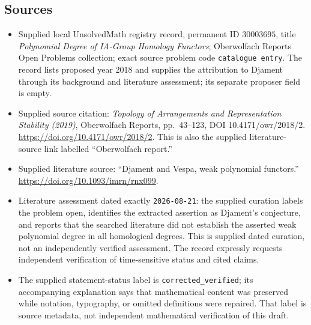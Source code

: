 \documentclass[11pt]{article}
\begin{document}
\subsection{Sources}
\begin{itemize}
\item Supplied local UnsolvedMath registry record, permanent ID \(30003695\), title \emph{Polynomial Degree of IA-Group Homology Functors}; Oberwolfach Reports Open Problems collection; exact source problem code \texttt{catalogue entry}. The record lists proposed year 2018 and supplies the attribution to Djament through its background and literature assessment; its separate proposer field is empty.
\item Supplied source citation: \emph{Topology of Arrangements and Representation Stability (2019)}, Oberwolfach Reports, pp.\ 43--123, DOI 10.4171/owr/2018/2. \url{https://doi.org/10.4171/owr/2018/2}. This is also the supplied literature-source link labelled ``Oberwolfach report.''
\item Supplied literature source: ``Djament and Vespa, weak polynomial functors.'' \url{https://doi.org/10.1093/imrn/rnx099}.
\item Literature assessment dated exactly \texttt{2026-08-21}: the supplied curation labels the problem open, identifies the extracted assertion as Djament's conjecture, and reports that the searched literature did not establish the asserted weak polynomial degree in all homological degrees. This is supplied dated curation, not an independently verified assessment. The record expressly requests independent verification of time-sensitive status and cited claims.
\item The supplied statement-status label is \texttt{corrected\_verified}; its accompanying explanation says that mathematical content was preserved while notation, typography, or omitted definitions were repaired. That label is source metadata, not independent mathematical verification of this draft.
\end{itemize}
\end{document}
